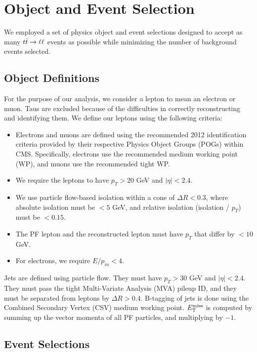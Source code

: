 \section{Object and Event Selection}
\label{sec:afb:selections}

We employed a set of physics object and event selections designed to
accept as many $t\bar{t} \rightarrow \ell\ell$ events as possible while minimizing the
number of background events selected.

\subsection{Object Definitions}
\label{ssec:afb:objdefs}

For the purpose of our analysis, we consider a lepton to mean an
electron or muon. Taus are excluded because of the difficulties in
correctly reconstructing and identifying them. We define our leptons
using the following criteria:

\begin{itemize}
\item Electrons and muons are defined using the recommended
  2012 identification criteria provided by their respective Physics Object
  Groups (POGs) within CMS. Specifically, electrons use the
  recommended medium working point (WP), and muons use the recommended
  tight WP.
\item We require the leptons to have $p_T > 20$ GeV and $|\eta| < 2.4$.
\item We use particle flow-based isolation within a cone of $\Delta R
  < 0.3$, where absolute isolation must be $< 5$ GeV, and relative
  isolation (isolation / $p_T$) must be $< 0.15$. %
\item The PF lepton and the reconstructed lepton must have $p_T$ that
  differ by $< 10$ GeV.
\item For electrons, we require $E / p_{in} < 4$. %
\end{itemize}

Jets are defined using particle flow. They must have $p_T > 30$ GeV
and $|\eta| < 2.4$. They must pass the tight Multi-Variate Analysis
(MVA) pileup ID, and they must be separated from leptons by $\Delta R
> 0.4$. B-tagging of jets is done using the Combined Secondary Vertex
(CSV) medium working point. $E_\text{T}^\text{miss}$ is computed by summing up the vector
momenta of all PF particles, and multiplying by $-1$.

\subsection{Event Selections}
\label{ssec:afb:eventsel}

